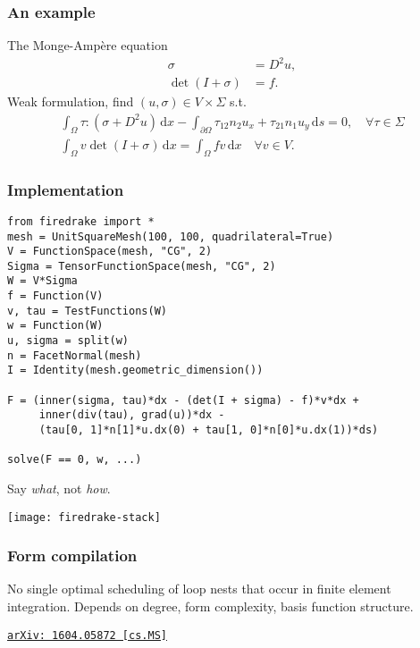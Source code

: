 \documentclass[presentation]{beamer}
\newcommand{\arxivlink}[2]{%
  \href{http://www.arxiv.org/abs/#1}%
  {{\small\texttt{arXiv:\,#1\,[#2]}}}%
}
\begin{document}
\begin{frame}
  \frametitle{An example}
  
  \begin{block}{The Monge-Amp\`ere equation}
    \begin{align*}
      \sigma &= D^2 u,\\
      \det(I + \sigma) &= f.
    \end{align*}
    Weak formulation, find $(u, \sigma) \in V \times \Sigma$ s.t.
    \begin{align*}
   \int_\Omega \tau:(\sigma + D^2u)\,\text{d}x
   - \int_{\partial\Omega} \tau_{12}n_2u_x + \tau_{21}n_1u_y\,\text{d}s
     =0, \quad \forall \tau \in \Sigma\\
   \int_\Omega v\det(I + \sigma)\,\text{d}x = \int_\Omega
   fv\,\text{d}x \quad \forall v \in V.
    \end{align*}
  \end{block}
\end{frame}
\begin{frame}[fragile]
  \frametitle{Implementation}
\begin{verbatim}
from firedrake import *
mesh = UnitSquareMesh(100, 100, quadrilateral=True)
V = FunctionSpace(mesh, "CG", 2)
Sigma = TensorFunctionSpace(mesh, "CG", 2)
W = V*Sigma
f = Function(V)
v, tau = TestFunctions(W)
w = Function(W)
u, sigma = split(w)
n = FacetNormal(mesh)
I = Identity(mesh.geometric_dimension())

F = (inner(sigma, tau)*dx - (det(I + sigma) - f)*v*dx +
     inner(div(tau), grad(u))*dx -
     (tau[0, 1]*n[1]*u.dx(0) + tau[1, 0]*n[0]*u.dx(1))*ds)

solve(F == 0, w, ...)
\end{verbatim}
\end{frame}

\begin{frame}[standout]
  Say \emph{what}, not \emph{how}.
\end{frame}
\begin{frame}
  \texttt{[image: firedrake-stack]}
\end{frame}

\begin{frame}
  \frametitle{Form compilation}
  No single optimal scheduling of loop nests that occur in finite
  element integration.  Depends on degree, form complexity, basis
  function structure.

  \cite{Luporini:2016} \arxivlink{1604.05872}{cs.MS}
\end{frame}
\end{document}
